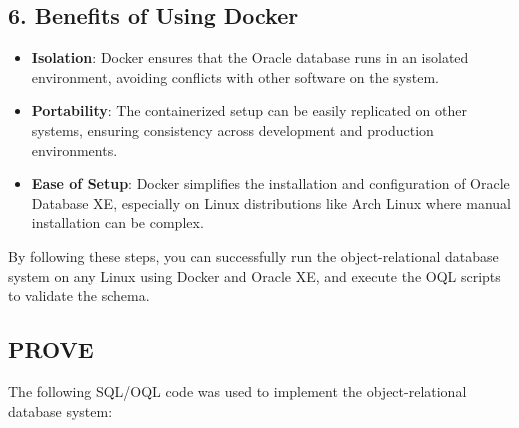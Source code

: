 \documentclass{article}
\begin{document}
\subsection*{6. Benefits of Using Docker}
\begin{itemize}
    \item \textbf{Isolation}: Docker ensures that the Oracle database runs in an isolated environment, avoiding conflicts with other software on the system.
    \item \textbf{Portability}: The containerized setup can be easily replicated on other systems, ensuring consistency across development and production environments.
    \item \textbf{Ease of Setup}: Docker simplifies the installation and configuration of Oracle Database XE, especially on Linux distributions like Arch Linux where manual installation can be complex.
\end{itemize}

By following these steps, you can successfully run the object-relational database system on any Linux using Docker and Oracle XE, and execute the OQL scripts to validate the schema.

\subsection*{PROVE}
The following SQL/OQL code was used to implement the object-relational database system:
\end{document}
